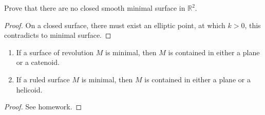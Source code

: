 \begin{exercise}[Homework]
    Prove that there are no closed smooth minimal surface in 
    \(\mathbb{R}^2\).
\end{exercise}
\begin{proof}
    On a closed surface, there must exist an elliptic point, at which 
    \(k>0\), this contradicts to minimal surface.
\end{proof}
\begin{theorem}
    \begin{enumerate}[(1)]
        \item If a surface of revolution \(M\) is minimal, then 
        \(M\) is contained in either a plane or a catenoid.
        \item If a ruled surface \(M\) is minimal, then \(M\) is 
        contained in either a plane or a helicoid.
    \end{enumerate}
\end{theorem}
\begin{proof}
    See homework.
\end{proof}
